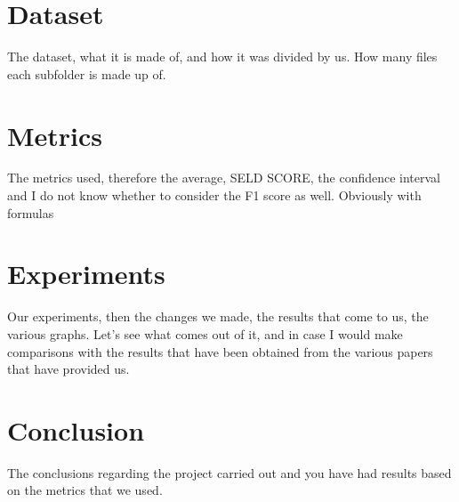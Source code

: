 \documentclass{article}
\begin{document}
    \section{Dataset}
    The dataset, what it is made of, and how it was divided by us. How many files each subfolder is made up of.
    \section{Metrics}
    The metrics used, therefore the average, SELD SCORE, the confidence interval and I do not know whether to consider the F1 score as well. Obviously with formulas 
    \section{Experiments}
    Our experiments, then the changes we made, the results that come to us, the various graphs.
    Let's see what comes out of it, and in case I would make comparisons with the results that have been obtained from the various papers that have provided us.
    \section{Conclusion}
    The conclusions regarding the project carried out and you have had results based on the metrics that we used.
\end{document}
